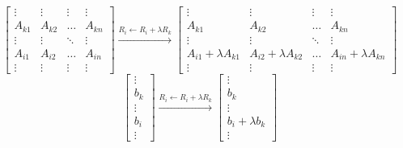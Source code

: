 	\[ \begin{bmatrix} \vdots & \vdots & \vdots & \vdots \\ A_{k1} & A_{k2} & \dots & A_{kn} \\ \vdots & \vdots & \ddots & \vdots \\ A_{i1} & A_{i2} & \dots & A_{in} \\ \vdots & \vdots & \vdots & \vdots \end{bmatrix} \xrightarrow{R_i \leftarrow R_i + \lambda{}R_k} \begin{bmatrix} \vdots & \vdots & \vdots & \vdots \\ A_{k1} & A_{k2} & \dots & A_{kn} \\ \vdots & \vdots & \ddots & \vdots \\ A_{i1}+\lambda{}A_{k1} & A_{i2}+\lambda{}A_{k2} & \dots & A_{in}+\lambda{}A_{kn} \\ \vdots & \vdots & \vdots & \vdots \end{bmatrix}\]
		\[ \begin{bmatrix} \vdots \\ b_k \\ \vdots \\ b_i \\ \vdots \end{bmatrix} \xrightarrow{R_i \leftarrow R_i + \lambda{}R_k} \begin{bmatrix} \vdots \\ b_k \\ \vdots \\ b_i + \lambda{}b_k \\ \vdots \end{bmatrix} \]
			
%

